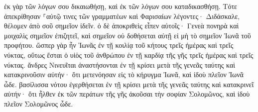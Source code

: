 \documentclass{openreader}
\begin{document}
ἐκ γὰρ τῶν λόγων σου δικαιωθήσῃ, καὶ ἐκ τῶν λόγων σου καταδικασθήσῃ. 
Τότε ἀπεκρίθησαν ⸀αὐτῷ τινες τῶν γραμματέων καὶ Φαρισαίων λέγοντες· Διδάσκαλε, θέλομεν ἀπὸ σοῦ σημεῖον ἰδεῖν. 
ὁ δὲ ἀποκριθεὶς εἶπεν αὐτοῖς· Γενεὰ πονηρὰ καὶ μοιχαλὶς σημεῖον ἐπιζητεῖ, καὶ σημεῖον οὐ δοθήσεται αὐτῇ εἰ μὴ τὸ σημεῖον Ἰωνᾶ τοῦ προφήτου. 
ὥσπερ γὰρ ἦν Ἰωνᾶς ἐν τῇ κοιλίᾳ τοῦ κήτους τρεῖς ἡμέρας καὶ τρεῖς νύκτας, οὕτως ἔσται ὁ υἱὸς τοῦ ἀνθρώπου ἐν τῇ καρδίᾳ τῆς γῆς τρεῖς ἡμέρας καὶ τρεῖς νύκτας. 
ἄνδρες Νινευῖται ἀναστήσονται ἐν τῇ κρίσει μετὰ τῆς γενεᾶς ταύτης καὶ κατακρινοῦσιν αὐτήν· ὅτι μετενόησαν εἰς τὸ κήρυγμα Ἰωνᾶ, καὶ ἰδοὺ πλεῖον Ἰωνᾶ ὧδε. 
βασίλισσα νότου ἐγερθήσεται ἐν τῇ κρίσει μετὰ τῆς γενεᾶς ταύτης καὶ κατακρινεῖ αὐτήν· ὅτι ἦλθεν ἐκ τῶν περάτων τῆς γῆς ἀκοῦσαι τὴν σοφίαν Σολομῶνος, καὶ ἰδοὺ πλεῖον Σολομῶνος ὧδε. 
\end{document}
